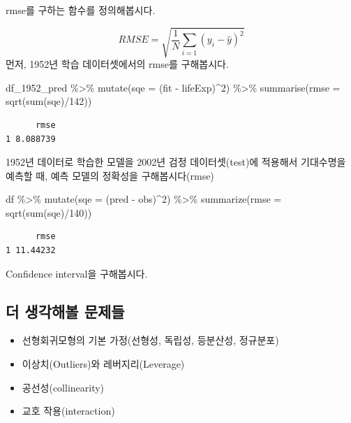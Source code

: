 \documentclass[
  letterpaper,
  DIV=11,
  numbers=noendperiod]{scrartcl}
\newenvironment{Shaded}{\begin{snugshade}}{\end{snugshade}}
\newcommand{\AttributeTok}[1]{\textcolor[rgb]{0.40,0.45,0.13}{#1}}
\newcommand{\DecValTok}[1]{\textcolor[rgb]{0.68,0.00,0.00}{#1}}
\newcommand{\FunctionTok}[1]{\textcolor[rgb]{0.28,0.35,0.67}{#1}}
\newcommand{\NormalTok}[1]{\textcolor[rgb]{0.00,0.23,0.31}{#1}}
\newcommand{\SpecialCharTok}[1]{\textcolor[rgb]{0.37,0.37,0.37}{#1}}
\providecommand{\tightlist}{%
  \setlength{\itemsep}{0pt}\setlength{\parskip}{0pt}}\usepackage{longtable,booktabs,array}
\begin{document}
rmse를 구하는 함수를 정의해봅시다.

\[RMSE = \sqrt{\frac{1}{N}{\sum_{i=1}(y_i-\hat{y})^2}}\] 먼저, 1952년
학습 데이터셋에서의 rmse를 구해봅시다.

\begin{Shaded}
\begin{Highlighting}[]
\NormalTok{df\_1952\_pred }\SpecialCharTok{\%\textgreater{}\%}
  \FunctionTok{mutate}\NormalTok{(}\AttributeTok{sqe =}\NormalTok{ (fit }\SpecialCharTok{{-}}\NormalTok{ lifeExp)}\SpecialCharTok{\^{}}\DecValTok{2}\NormalTok{) }\SpecialCharTok{\%\textgreater{}\%}
  \FunctionTok{summarise}\NormalTok{(}\AttributeTok{rmse =} \FunctionTok{sqrt}\NormalTok{(}\FunctionTok{sum}\NormalTok{(sqe)}\SpecialCharTok{/}\DecValTok{142}\NormalTok{))}
\end{Highlighting}
\end{Shaded}

\begin{verbatim}
      rmse
1 8.088739
\end{verbatim}

1952년 데이터로 학습한 모델을 2002년 검정 데이터셋(test)에 적용해서
기대수명을 예측할 때, 예측 모델의 정확성을 구해봅시다(rmse)

\begin{Shaded}
\begin{Highlighting}[]
\NormalTok{df }\SpecialCharTok{\%\textgreater{}\%}
  \FunctionTok{mutate}\NormalTok{(}\AttributeTok{sqe =}\NormalTok{ (pred }\SpecialCharTok{{-}}\NormalTok{ obs)}\SpecialCharTok{\^{}}\DecValTok{2}\NormalTok{) }\SpecialCharTok{\%\textgreater{}\%}
  \FunctionTok{summarize}\NormalTok{(}\AttributeTok{rmse =} \FunctionTok{sqrt}\NormalTok{(}\FunctionTok{sum}\NormalTok{(sqe)}\SpecialCharTok{/}\DecValTok{140}\NormalTok{))}
\end{Highlighting}
\end{Shaded}

\begin{verbatim}
      rmse
1 11.44232
\end{verbatim}

Confidence interval을 구해봅시다.

\hypertarget{uxb354-uxc0dduxac01uxd574uxbcfc-uxbb38uxc81cuxb4e4}{%
\subsection{더 생각해볼
문제들}\label{uxb354-uxc0dduxac01uxd574uxbcfc-uxbb38uxc81cuxb4e4}}

\begin{itemize}
\tightlist
\item
  선형회귀모형의 기본 가정(선형성, 독립성, 등분산성, 정규분포)\\
\item
  이상치(Outliers)와 레버지리(Leverage)\\
\item
  공선성(collinearity)\\
\item
  교호 작용(interaction)
\end{itemize}
\end{document}
